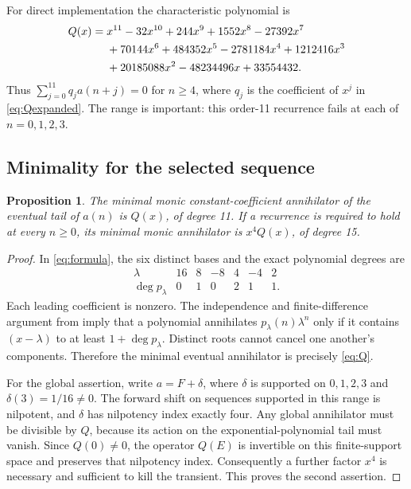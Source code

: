 \documentclass[11pt,letterpaper]{article}
\newtheorem{proposition}[theorem]{Proposition}
\theoremstyle{definition}
\newcommand{\1}{\mathbf 1}
\begin{document}
For direct implementation the characteristic polynomial is
\begin{align}
 Q(x)={}&x^{11}-32x^{10}+244x^9+1552x^8-27392x^7\notag\\
 &+70144x^6+484352x^5-2781184x^4+1212416x^3\notag\\
 &+20185088x^2-48234496x+33554432.
 \label{eq:Qexpanded}
\end{align}
Thus $\sum_{j=0}^{11}q_ja(n+j)=0$ for $n\ge4$, where $q_j$ is the coefficient
of $x^j$ in \eqref{eq:Qexpanded}. The range is important: this order-11
recurrence fails at each of $n=0,1,2,3$.

\subsection{Minimality for the selected sequence}
\begin{proposition}\label{prop:minimal}
The minimal monic constant-coefficient annihilator of the eventual tail of
$a(n)$ is $Q(x)$, of degree 11. If a recurrence is required to hold at every
$n\ge0$, its minimal monic annihilator is $x^4Q(x)$, of degree 15.
\end{proposition}
\begin{proof}
In \eqref{eq:formula}, the six distinct bases and the exact polynomial degrees
are
\[
\begin{array}{c|rrrrrr}
\lambda&16&8&-8&4&-4&2\\\hline
\deg p_\lambda&0&1&0&2&1&1.
\end{array}
\]
Each leading coefficient is nonzero. The independence and finite-difference
argument from  imply that a polynomial annihilates
$p_\lambda(n)\lambda^n$ only if it contains $(x-\lambda)$ to at least
$1+\deg p_\lambda$. Distinct roots cannot cancel one another's components.
Therefore the minimal eventual annihilator is precisely \eqref{eq:Q}.

For the global assertion, write $a=F+\delta$, where $\delta$ is supported on
$0,1,2,3$ and $\delta(3)=1/16\ne0$. The forward shift on sequences supported in
this range is nilpotent, and $\delta$ has nilpotency index exactly four. Any
global annihilator must be divisible by $Q$, because its action on the
exponential-polynomial tail must vanish. Since $Q(0)\ne0$, the operator $Q(E)$
is invertible on this finite-support space and preserves that nilpotency
index. Consequently a further factor $x^4$ is necessary and sufficient to
kill the transient. This proves the second assertion.
\end{proof}
\end{document}
